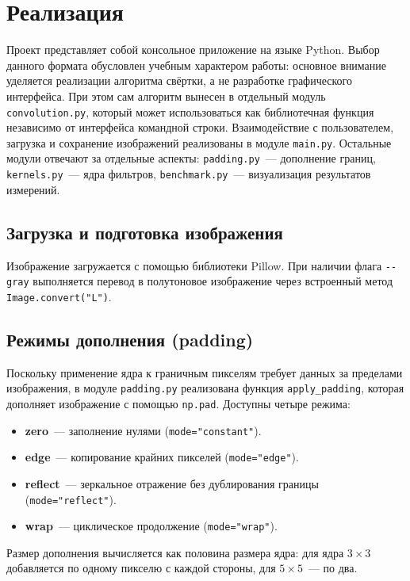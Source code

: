 \documentclass[a4paper]{article}
\begin{document}
\section{Реализация}

Проект представляет собой консольное приложение на языке Python. Выбор данного формата обусловлен учебным характером работы: основное внимание уделяется реализации алгоритма свёртки, а не разработке графического интерфейса. При этом сам алгоритм вынесен в отдельный модуль \verb|convolution.py|, который может использоваться как библиотечная функция независимо от интерфейса командной строки. Взаимодействие с пользователем, загрузка и сохранение изображений реализованы в модуле \verb|main.py|. Остальные модули отвечают за отдельные аспекты: \verb|padding.py|~--- дополнение границ, \verb|kernels.py|~--- ядра фильтров, \verb|benchmark.py|~--- визуализация результатов измерений.

\subsection{Загрузка и подготовка изображения}

Изображение загружается с помощью библиотеки Pillow. При наличии флага \verb|--gray| выполняется перевод в полутоновое изображение через встроенный метод \verb|Image.convert("L")|. 
\subsection{Режимы дополнения (padding)}

Поскольку применение ядра к граничным пикселям требует данных за пределами изображения, в модуле \verb|padding.py| реализована функция \verb|apply_padding|, которая дополняет изображение с помощью \verb|np.pad|. Доступны четыре режима:

\begin{itemize}
    \item \textbf{zero}~--- заполнение нулями (\verb|mode="constant"|).
    \item \textbf{edge}~--- копирование крайних пикселей (\verb|mode="edge"|).
    \item \textbf{reflect}~--- зеркальное отражение без дублирования границы (\verb|mode="reflect"|).
    \item \textbf{wrap}~--- циклическое продолжение (\verb|mode="wrap"|).
\end{itemize}

Размер дополнения вычисляется как половина размера ядра: для ядра $3 \times 3$ добавляется по одному пикселю с каждой стороны, для $5 \times 5$~--- по два.
\end{document}
